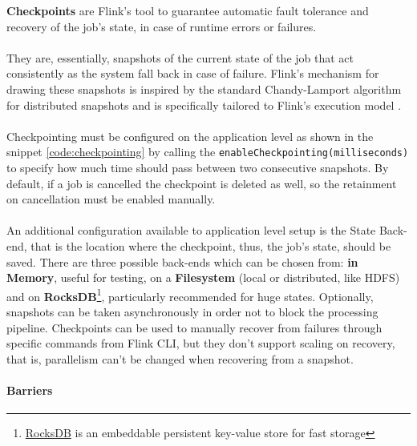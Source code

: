 \textbf{Checkpoints} are Flink's tool to guarantee automatic fault tolerance and recovery of the job's state, in case of runtime errors or failures. 
\\
\\
They are, essentially, snapshots of the current state of the job that act consistently as the system fall back in case of failure. Flink’s mechanism for drawing these snapshots is inspired by the standard Chandy-Lamport algorithm \cite{Chandy:1985:DSD:214451.214456} for distributed snapshots and is specifically tailored to Flink’s execution model \cite{DBLP:journals/corr/CarboneFEHT15}. 
\\
\\
Checkpointing must be configured on the application level as shown in the snippet \ref{code:checkpointing} by calling the \texttt{enableCheckpointing(milliseconds)} to specify how much time should pass between two consecutive snapshots. By default, if a job is cancelled the checkpoint is deleted as well, so the retainment on cancellation must be enabled manually. 
\\
\\
An additional configuration available to application level setup is the State Back-end, that is the location where the checkpoint, thus, the job's state, should be saved. There are three possible back-ends which can be chosen from: \textbf{in Memory}, useful for testing, on a \textbf{Filesystem} (local or distributed, like HDFS) and on \textbf{RocksDB}\footnote{\href{http://rocksdb.org/}{RocksDB} is an embeddable persistent key-value store for fast storage}, particularly recommended for huge states. Optionally, snapshots can be taken asynchronously in order not to block the processing pipeline.
Checkpoints can be used to manually recover from failures through specific commands from Flink CLI, but they don't support scaling on recovery, that is, parallelism can't be changed when recovering from a snapshot.

\paragraph{Barriers}

